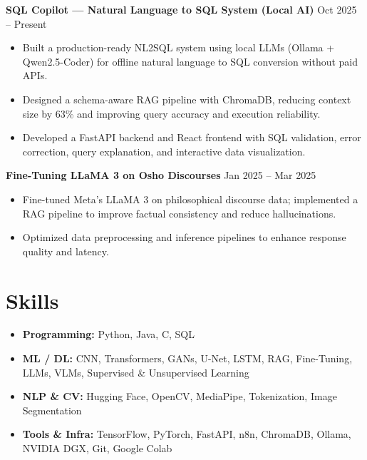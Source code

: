 \documentclass[a4paper,10pt]{article}
\begin{document}
\textbf{SQL Copilot — Natural Language to SQL System (Local AI)} \hfill Oct 2025 -- Present \\
\begin{itemize}[noitemsep, leftmargin=*, topsep=.5pt]
    \item Built a production-ready NL2SQL system using local LLMs (Ollama + Qwen2.5-Coder) for offline natural language to SQL conversion without paid APIs.
    \item Designed a schema-aware RAG pipeline with ChromaDB, reducing context size by 63\% and improving query accuracy and execution reliability.
    \item Developed a FastAPI backend and React frontend with SQL validation, error correction, query explanation, and interactive data visualization.
\end{itemize}

\vspace{2pt}

\textbf{Fine-Tuning LLaMA 3 on Osho Discourses} \hfill Jan 2025 -- Mar 2025 \\
\begin{itemize}[noitemsep, leftmargin=*, topsep=.5pt]
    \item Fine-tuned Meta's LLaMA 3 on philosophical discourse data; implemented a RAG pipeline to improve factual consistency and reduce hallucinations.
    \item Optimized data preprocessing and inference pipelines to enhance response quality and latency.
\end{itemize}

\section{Skills}
\begin{itemize}[noitemsep, leftmargin=*, topsep=2pt]
    \item \textbf{Programming:} Python, Java, C, SQL
    \item \textbf{ML / DL:} CNN, Transformers, GANs, U-Net, LSTM, RAG, Fine-Tuning, LLMs, VLMs, Supervised \& Unsupervised Learning
    \item \textbf{NLP \& CV:} Hugging Face, OpenCV, MediaPipe, Tokenization, Image Segmentation
    \item \textbf{Tools \& Infra:} TensorFlow, PyTorch, FastAPI, n8n, ChromaDB, Ollama, NVIDIA DGX, Git, Google Colab
\end{itemize}
\end{document}
